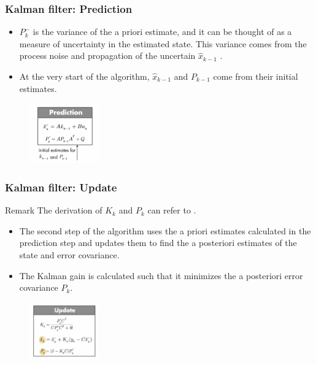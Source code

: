 \documentclass{beamer}
\begin{document}
\begin{frame}
	\frametitle{Kalman filter: Prediction}
	\begin{itemize}
		\item $P^-_k $ is the variance of the a priori estimate, and it can be thought of as a measure of uncertainty in the estimated state. This variance comes from the process noise and propagation of the uncertain $\hat{x}_{k-1} $ .
		\item At the very start of the algorithm, $\hat{x}_{k-1} $ and $P_{k-1} $ come from their initial estimates. 
	\end{itemize}
	\begin{figure}
		\centering
		\includegraphics[width=3cm]{initial.png}
	\end{figure}
\end{frame}

\begin{frame}
	\frametitle{Kalman filter: Update}
	 
	\begin{block}{Remark}
		The derivation of $K_k $ and $P_k $ can refer to \href{https://en.wikipedia.org/wiki/Kalman_filter}{}.
	\end{block}
	\begin{itemize}
		\item The second step of the algorithm uses the a priori estimates calculated in the prediction step and updates them to find the a posteriori estimates of the state and error covariance.
		\item The Kalman gain is calculated such that it minimizes the a posteriori error covariance $P_k $. 
	\end{itemize}
	\begin{figure}
		\centering
		\includegraphics[width=3cm]{update.png}
	\end{figure}
	
	
\end{frame}
\end{document}
